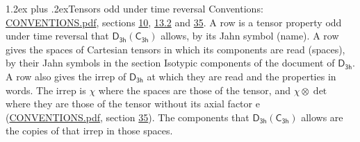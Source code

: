 \documentclass[10pt,a4paper]{article}
\makeatletter
\renewcommand\section{\@startsection{section}{1}{\z@}{-3ex plus -1ex minus -.2ex}%
  {1.2ex plus .2ex}{\normalfont\large\sffamily\bfseries\color{parttitle}}}
\numberwithin{equation}{section}
\newcommand{\grp}[1]{\mathsf{#1}}
\newcommand{\irrprod}{\otimes}
\makeatother
\begin{document}
\section{Tensors odd under time reversal}\label{s:time_odd}
Conventions: \href{../../CONVENTIONS.pdf}{CONVENTIONS.pdf}, sections \href{../../../rotation/CONVENTIONS.pdf\#conv.10}{10}, \href{../../../rotation/CONVENTIONS.pdf\#conv.13.2}{13.2} and \href{../../CONVENTIONS.pdf\#conv.35}{35}.
\leavevmode\label{n:head.name.property}A row is a tensor property odd under time reversal that $\grp{D_{3h}}(\grp{C_{3h}})$ allows, by its Jahn symbol (name). \label{n:head.spaces}A row gives the spaces of Cartesian tensors in which its components are read (spaces), by their Jahn symbols in the section Isotypic components of the document of \href{../../../rotation/data/pdf/D3h.pdf}{$\grp{D_{3h}}$}. \label{n:head.properties}A row also gives the irrep of $\grp{D_{3h}}$ at which they are read and the properties in words. The irrep is $\chi$ where the spaces are those of the tensor, and $\chi \irrprod \det$ where they are those of the tensor without its axial factor e (\href{../../CONVENTIONS.pdf}{CONVENTIONS.pdf}, section \href{../../CONVENTIONS.pdf\#conv.35}{35}). The components that $\grp{D_{3h}}(\grp{C_{3h}})$ allows are the copies of that irrep in those spaces.
\end{document}
